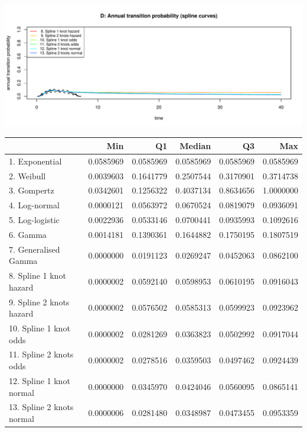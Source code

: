 \documentclass[]{article}
\begin{document}
\begin{flushleft}\includegraphics[height=0.29\textheight]{images/validate_extrapolation1-4} \end{flushleft}

\begin{tabular}{lrrrrr}
\toprule
  & Min & Q1 & Median & Q3 & Max\\
\midrule
\rowcolor{gray!6}  1. Exponential & 0.0585969 & 0.0585969 & 0.0585969 & 0.0585969 & 0.0585969\\
2. Weibull & 0.0039603 & 0.1641779 & 0.2507544 & 0.3170901 & 0.3714738\\
\rowcolor{gray!6}  3. Gompertz & 0.0342601 & 0.1256322 & 0.4037134 & 0.8634656 & 1.0000000\\
4. Log-normal & 0.0000121 & 0.0563972 & 0.0670524 & 0.0819079 & 0.0936091\\
\rowcolor{gray!6}  5. Log-logistic & 0.0022936 & 0.0533146 & 0.0700441 & 0.0935993 & 0.1092616\\
6. Gamma & 0.0014181 & 0.1390361 & 0.1644882 & 0.1750195 & 0.1807519\\
\rowcolor{gray!6}  7. Generalised Gamma & 0.0000000 & 0.0191123 & 0.0269247 & 0.0452063 & 0.0862100\\
8. Spline 1 knot hazard & 0.0000002 & 0.0592140 & 0.0598953 & 0.0610195 & 0.0916043\\
\rowcolor{gray!6}  9. Spline 2 knots hazard & 0.0000002 & 0.0576502 & 0.0585313 & 0.0599923 & 0.0923962\\
10. Spline 1 knot odds & 0.0000002 & 0.0281269 & 0.0363823 & 0.0502992 & 0.0917044\\
\rowcolor{gray!6}  11. Spline 2 knots odds & 0.0000002 & 0.0278516 & 0.0359503 & 0.0497462 & 0.0924439\\
12. Spline 1 knot normal & 0.0000000 & 0.0345970 & 0.0424046 & 0.0560095 & 0.0865141\\
\rowcolor{gray!6}  13. Spline 2 knots normal & 0.0000006 & 0.0281480 & 0.0348987 & 0.0473455 & 0.0953359\\
\bottomrule
\end{tabular}
\end{document}
